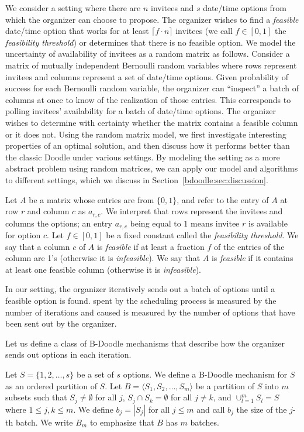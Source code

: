 We consider a setting where there are $n$ invitees and $s$ date/time options from which the organizer can choose to propose. The organizer wishes to find a {\em feasible} date/time option that works for at least $\lceil f \cdot n \rceil$ invitees (we call $f\in [0,1]$ the {\em feasibility threshold}) or determines that there is no feasible option.
We model the uncertainty of availability of invitees as a random matrix as follows.
Consider a matrix of mutually independent Bernoulli random variables where rows represent invitees and columns represent a set of date/time options. 
Given probability of success for each Bernoulli random variable, the organizer can ``inspect'' a batch of columns at once to know of the realization of those entries. This corresponds to polling invitees' availability for a batch of date/time options. The organizer wishes to determine with certainty whether the matrix contains a feasible column or it does not. Using the random matrix model, we first investigate interesting properties of an optimal solution, and then discuss how it performs better than the classic Doodle under various settings.
By modeling the setting as a more abstract problem using random matrices, we can apply our model and algorithms to different settings, which we discuss in Section~\ref{bdoodle:sec:discussion}.

 \begin{definition}[Feasibility]
 Let $A$ be a matrix whose entries are from $\{0,1\}$, and refer to the entry of $A$ at row $r$ and column $c$ as $a_{r,c}$.
 We interpret that rows represent the invitees and columns the options; an entry $a_{r,c}$ being equal to $1$ means invitee $r$ is available for option $c$.  
 Let $f \in [0,1]$ be a fixed constant called the {\em feasibility threshold}.
 We say that a column $c$ of $A$ is {\em feasible} if at least a fraction $f$ of the entries of the column are 1's (otherwise it is {\em infeasible}).
 We say that $A$ is {\em feasible} if it contains at least one feasible column (otherwise it is {\em infeasible}).
 \end{definition}
 
In our setting, the organizer iteratively sends out a batch of options until a feasible option is found. 
\Times spent by the scheduling process is measured by the number of iterations and \Inconveniences caused is measured by the number of options that have been sent out by the organizer.

Let us define a class of B-Doodle mechanisms that describe how the organizer sends out options in each iteration.
\begin{definition}\label{bdoodle:def:BDoodleMechanism}
Let $S = \{1, 2, \dots, s\}$ be a set of $s$ options.
We define a B-Doodle mechanism for $S$ as an ordered partition of $S$.
Let $B = \langle S_1, S_2, \dots, S_m \rangle$ be a partition of $S$ into $m$ subsets such that $S_j \neq\emptyset$ for all $j$, $S_j \cap S_k = \emptyset$ for all $j \neq k$, and $\cup_{l=1}^{m} S_l = S$ where $1 \leq j,k \leq m$.
We define $b_j = |S_j|$ for all $j \leq m$ and call $b_j$ the size of the $j$-th batch.
We write $B_m$ to emphasize that $B$ has $m$ batches.
\end{definition}


